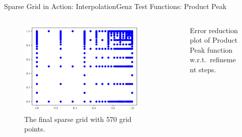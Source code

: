 \begin{frame}{Sparse Grid in Action: Interpolation}{Genz Test Functions: Product Peak}
    \begin{columns}
        \begin{column}{0.4\textwidth}
            \begin{figure}
                \centering
                \includegraphics[width=\textwidth]{figures/grid_final_peak.pdf}
                \caption{The final sparse grid with 570 grid points.}
            \end{figure}
        \end{column}
        \begin{column}{0.5\textwidth}
            \begin{figure}
                \centering
                \scalebox{0.7}{}
                \caption{Error reduction plot of Product Peak function w.r.t.\ refinement steps.}
            \end{figure}
        \end{column}
    \end{columns}
\end{frame}

